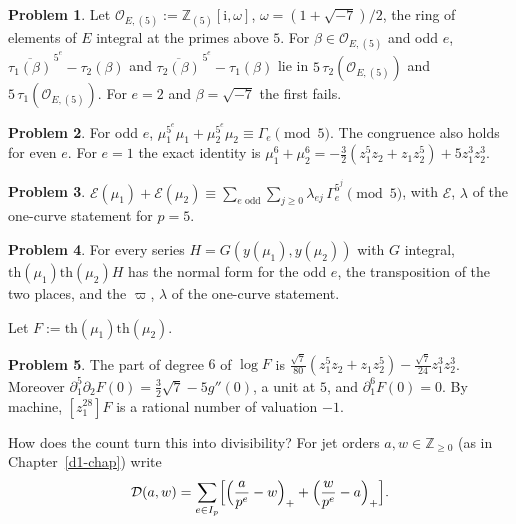 \documentclass[reqno]{amsart}
\newcounter{chap}
\theoremstyle{plain}
\theoremstyle{definition}
\newtheorem{problem}{Problem}[section]
\theoremstyle{remark}
\newcommand{\Z}{\mathbb{Z}}
\newcommand{\Oc}{\mathcal{O}}
\newcommand{\Dc}{\mathcal{D}}
\newcommand{\Ec}{\mathcal{E}}
\newcommand{\tth}{\mathrm{th}}
\newcommand{\ii}{\mathrm{i}}
\begin{document}
\begin{problem}\label{pr:frobenius}
Let \(\Oc_{E,(5)} := \Z_{(5)}[\ii, \omega]\), \(\omega = (1+\sqrt{-7})/2\), the ring of elements of \(E\) integral at the primes above \(5\).  For \(\beta \in \Oc_{E,(5)}\) and odd \(e\), \(\overline{\tau_1(\beta)}^{\,5^e} - \tau_2(\beta)\) and \(\overline{\tau_2(\beta)}^{\,5^e} - \tau_1(\beta)\) lie in \(5\,\tau_2(\Oc_{E,(5)})\) and \(5\,\tau_1(\Oc_{E,(5)})\).  For \(e = 2\) and \(\beta = \sqrt{-7}\) the first fails.
\end{problem}

\begin{problem}\label{pr:pair-coupling}
For odd \(e\), \(\mu_1^{5^e} \mu_1 + \mu_2^{5^e} \mu_2 \equiv \Gamma_e \pmod 5\).  The congruence also holds for even \(e\).  For \(e = 1\) the exact identity is \(\mu_1^6 + \mu_2^6 = -\tfrac32(z_1^5 z_2 + z_1 z_2^5) + 5 z_1^3 z_2^3\).
\end{problem}

\begin{problem}\label{pr:pair-exponent}
\(\Ec(\mu_1) + \Ec(\mu_2) \equiv \sum_{e \text{ odd}}\sum_{j \ge 0} \lambda_{ej}\,\Gamma_e^{5^j} \pmod 5\), with \(\Ec\), \(\lambda\) of the one-curve statement for \(p = 5\).
\end{problem}

\begin{problem}\label{pr:pair-normal-form}
For every series \(H = G(y(\mu_1), y(\mu_2))\) with \(G\) integral, \(\tth(\mu_1)\tth(\mu_2)H\) has the normal form for the odd \(e\), the transposition of the two places, and the \(\varpi\), \(\lambda\) of the one-curve statement.
\end{problem}

Let \(F := \tth(\mu_1)\tth(\mu_2)\).

\begin{problem}\label{pr:pair-check}
The part of degree \(6\) of \(\log F\) is \(\tfrac{\sqrt7}{80}(z_1^5 z_2 + z_1 z_2^5) - \tfrac{\sqrt7}{24} z_1^3 z_2^3\).  Moreover \(\partial_1^5\partial_2 F(0) = \tfrac32\sqrt7 - 5g''(0)\), a unit at \(5\), and \(\partial_1^6 F(0) = 0\).  By machine, \([z_1^{28}]F\) is a rational number of valuation \(-1\).
\end{problem}

How does the count turn this into divisibility?  For jet orders \(a, w \in \Z_{\ge 0}\) (as in Chapter~\ref{d1-chap}) write
\[
  \Dc(a, w) = \sum_{e \in I_p}\Bigl[\Bigl(\frac{a}{p^e} - w\Bigr)_+ + \Bigl(\frac{w}{p^e} - a\Bigr)_+\Bigr].
\]
\end{document}
